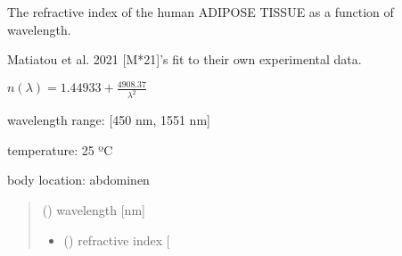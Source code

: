 \documentclass[letterpaper,10pt,english]{sphinxmanual}
\begin{document}
\begin{fulllineitems}
\label{\detokenize{05_refractive_index:skinoptics.refractive_index.n_AT_Matiatou}}
\pysigstartsignatures
{}
\pysigstopsignatures
\begin{DUlineblock}{0em}
\item[] The refractive index of the human ADIPOSE TISSUE as a function of wavelength.
\item[] Matiatou et al. 2021 {[}M*21{]}’s fit to their own experimental data.
\end{DUlineblock}

\sphinxAtStartPar
\(n(\lambda) = 1.44933 + \frac{4908.37}{\lambda^2}\)

\begin{DUlineblock}{0em}
\item[] wavelength range: {[}450 nm, 1551 nm{]}
\item[] temperature: 25 ºC
\item[] body location: abdominen
\end{DUlineblock}
\begin{quote}\begin{description}
\sphinxAtStartPar
{} () \textendash{} wavelength {[}nm{]}

\sphinxAtStartPar
\begin{itemize}
\item {} 
\sphinxAtStartPar
{} () \textendash{} refractive index {[}\sphinxhyphen{}{]}

\end{itemize}


\end{description}\end{quote}

\end{fulllineitems}

\end{document}

